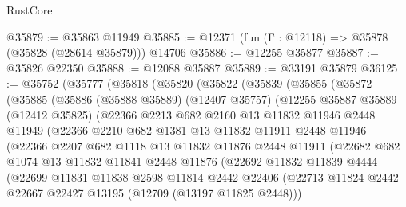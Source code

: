 \begin{lexlean}{RustCore}
\begin{coremodule}
@35879 := @35863 @11949
@35885 := @12371 (fun (Γ : @12118) => @35878 (@35828 (@28614 @35879))) @14706
@35886 := @12255 @35877
@35887 := @35826 @22350
@35888 := @12088 @35887
@35889 := @33191 @35879
@36125 := @35752
    (@35777
      (@35818
        (@35820
          (@35822
            (@35839
              (@35855
                (@35872
                  (@35885
                    (@35886
                      (@35888 @35889)
                      (@12407 @35757)
                      (@12255
                        @35887
                        @35889
                        (@12412 @35825)
                        (@22366
                          @2213
                          @682
                          @2160
                          @13
                          @11832
                          @11946
                          @2448
                          @11949
                          (@22366
                            @2210
                            @682
                            @1381
                            @13
                            @11832
                            @11911
                            @2448
                            @11946
                            (@22366
                              @2207
                              @682
                              @1118
                              @13
                              @11832
                              @11876
                              @2448
                              @11911
                              (@22682
                                @682
                                @1074
                                @13
                                @11832
                                @11841
                                @2448
                                @11876
                                (@22692
                                  @11832
                                  @11839
                                  @4444
                                  (@22699
                                    @11831
                                    @11838
                                    @2598
                                    @11814
                                    @2442
                                    @22406
                                    (@22713
                                      @11824
                                      @2442
                                      @22667
                                      @22427
                                      @13195
                                      (@12709 (@13197 @11825 @2448)))

\end{coremodule}
\end{lexlean}
